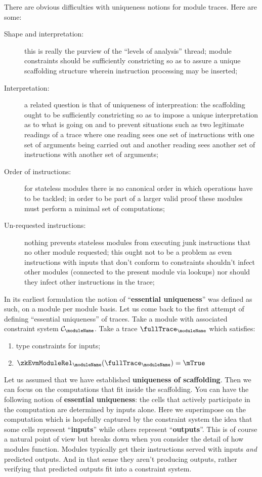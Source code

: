 There are obvious difficulties with uniqueness notions for module traces. Here are some:
\begin{description}
    \item[Shape and interpretation:] this is really the purview of the ``levels of analysis'' thread; module constraints should be sufficiently constricting so as to assure a unique scaffolding structure wherein instruction processing may be inserted;
    \item[Interpretation:] a related question is that of uniqueness of interpreation: the scaffolding ought to be sufficiently constricting so as to impose a unique interpretation as to what is going on and to prevent situations such as two legitimate readings of a trace where one reading sees one set of instructions with one set of arguments being carried out and another reading sees another set of instructions with another set of arguments; 
    \item[Order of instructions:] for stateless modules there is no canonical order in which operations have to be tackled; in order to be part of a larger valid proof these modules must perform a minimal set of computations;
    \item[Un-requested instructions:] nothing prevents stateless modules from executing junk instructions that no other module requested; this ought not to be a problem as even instructions with inputs that don't conform to constraints shouldn't infect other modules (connected to the present module via lookups) nor should they infect other instructions in the trace;
\end{description}
In its earliest formulation the notion of ``\textbf{essential uniqueness}'' was defined as such, on a module per module basis. Let us come back to the first attempt of defining ``essential uniqueness'' of traces. Take a module \moduleName{} with associated constraint system $\mathcal{C}_\moduleName$. Take a trace $\fullTrace_\moduleName$ which satisfies:
\begin{enumerate}
     \item type constraints for \godGiven{} inputs;
     \item $\zkEvmModuleRel_{\moduleName}(\fullTrace_\moduleName) = \mTrue$
\end{enumerate}
Let us assumed that we have established \textbf{uniqueness of scaffolding}. Then we can focus on the computations that fit inside the scaffolding. You can have the following notion of \textbf{essential uniqueness}: the cells that actively participate in the computation are determined by inputs alone. Here we superimpose on the computation which is hopefully captured by the constraint system the idea that some cells represent ``\textbf{inputs}'' while others represent ``\textbf{outputs}''. This is of course a natural point of view but breaks down when you consider the detail of how modules function. Modules typically get their instructions served with inputs \emph{and} predicted outputs. And in that sense they aren't producing outputs, rather verifying that predicted outputs fit into a constraint system.

